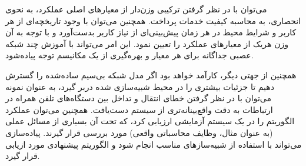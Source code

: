 می‌توان با در نظر گرفتن ترکیبی وزن‌دار از معیارهای اصلی عملکرد، به نحوی انحصاری، به محاسبه کیفیت خدمات پرداخت. همچنین می‌توان با وجود تاریخچه‌ای از‌ هر کاربر و شرایط محیط در هر زمان پیش‌بینی‌ای از نیاز کاربر بدست‌آورد و با توجه به آن وزن‌ هریک از معیارهای عملکرد را تعیین‌ نمود. این امر می‌تواند با آموزش چند شبکه عصبی جداگانه برای هر معیار و بهره‌گیری از یک مکانیسم توجه پیاده‌شود. 


همچنین از جهتی دیگر، کارآمد خواهد بود اگر مدل شبکه بی‌سیم ساده‌شده را گسترش دهیم تا جزئیات بیشتری را در محیط شبیه‌سازی شده دربر گیرد، به عنوان نمونه می‌توان با در نظر گرفتن خطای انتقال و تداخل بین دستگاه‌های تلفن همراه در ارتباطات به دقت واقع‌بینانه‌تری از سیستم دست‌یافت. همچنین می‌توان عملکرد الگوریتم را در یک سیستم آزمایشی ارزیابی کرد، که تحت آن بسیاری از مسائل عملی (به عنوان مثال، وظایف محاسباتی واقعی) مورد بررسی قرار گیرند. پیاده‌سازی می‌تواند با استفاده از شبیه‌سازهای مناسب انجام شود و الگوریتم پیشنهادی مورد ازیابی قرار گیرد. 



 
 

 


 

  
  
  
  
  
 
 
 
 





